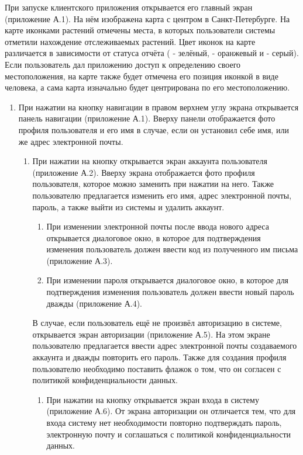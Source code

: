 \tab
При запуске клиентского приложения открывается его главный экран (приложение А.1).
На нём изображена карта с центром в Санкт-Петербурге.
На карте иконками растений отмечены места, в которых пользователи системы отметили нахождение отслеживаемых растений.
Цвет иконок на карте различается в зависимости от статуса отчёта ( - зелёный,  - оранжевый и  - серый).
Если пользователь дал приложению доступ к определению своего местоположения, на карте также будет отмечена его позиция иконкой в виде человека, а сама карта изначально будет центрирована по его местоположению.
\begin{enumerate}
	\item При нажатии на кнопку навигации в правом верхнем углу экрана открывается панель навигации (приложение А.1).
	Вверху панели отображается фото профиля пользователя и его имя в случае, если он установил себе имя, или же адрес электронной почты.
	\begin{enumerate}
		\item При нажатии на кнопку  открывается экран аккаунта пользователя (приложение А.2).
		Вверху экрана отображается фото профиля пользователя, которое можно заменить при нажатии на него.
		Также пользователю предлагается изменить его имя, адрес электронной почты, пароль, а также выйти из системы и удалить аккаунт.
		\begin{enumerate}
			\item При изменении электронной почты после ввода нового адреса открывается диалоговое окно, в которое для подтверждения изменения пользователь должен ввести код из полученного им письма (приложение А.3).
			\item При изменении пароля открывается диалоговое окно, в которое для подтверждения изменения пользователь должен ввести новый пароль дважды (приложение А.4).
		\end{enumerate}
		В случае, если пользователь ещё не произвёл авторизацию в системе, открывается экран авторизации (приложение А.5).
		На этом экране пользователю предлагается ввести адрес электронной почты создаваемого аккаунта и дважды повторить его пароль.
		Также для создания профиля пользователю необходимо поставить флажок о том, что он согласен с политикой конфиденциальности данных.
		\begin{enumerate}
			\item При нажатии на кнопку  открывается экран входа в систему (приложение А.6).
			От экрана авторизации он отличается тем, что для входа систему нет необходимости повторно подтверждать пароль, электронную почту и соглашаться с политикой конфиденциальности данных.

\end{enumerate}
\end{enumerate}
\end{enumerate}
